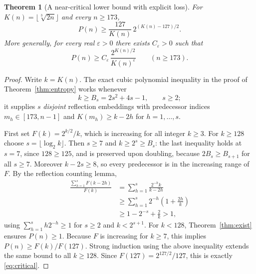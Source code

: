 \documentclass[10pt]{article}
\newtheorem{theorem}{Theorem}
\begin{document}
\begin{theorem}[A near-critical lower bound with explicit loss]
\label{thm:critical}
For $K(n)=\lfloor\sqrt[3]{2n}\rfloor$ and every $n\ge173$,
\begin{equation}\label{eq:critical}
\boxed{\displaystyle
P(n)\ge\frac{127}{K(n)}\,2^{(K(n)-127)/2}.}
\end{equation}
More generally, for every real $\varepsilon>0$
there exists $C_\varepsilon>0$ such that
\begin{equation}\label{eq:eps}
\boxed{\displaystyle
P(n)\ge C_\varepsilon\,
\frac{2^{K(n)/2}}{K(n)^\varepsilon}
\qquad(n\ge173).}
\end{equation}
\end{theorem}
\begin{proof}
Write $k=K(n)$. The exact cubic polynomial
inequality in the proof of
Theorem~\ref{thm:entropy} works whenever
\[
k\ge B_s=2s^2+4s-1,\qquad
s\ge2;
\]
it supplies $s$ \emph{disjoint} reflection
embeddings with predecessor indices
$m_h\in[173,n-1]$ and
$K(m_h)\ge k-2h$ for $h=1,\dots,s$.

First set $F(k)=2^{k/2}/k$, which is increasing
for all integer $k\ge3$. For $k\ge128$ choose
$s=\lfloor\log_2 k\rfloor$.
Then $s\ge7$ and $k\ge 2^s\ge B_s$:
the last inequality holds at $s=7$, since
$128\ge125$, and is preserved upon doubling,
because $2B_s\ge B_{s+1}$ for all $s\ge7$.
Moreover $k-2s\ge8$, so every predecessor
is in the increasing range of $F$.
By the reflection counting lemma,
\[
\begin{aligned}
\frac{\sum_{h=1}^{s}F(k-2h)}{F(k)}
&=\sum_{h=1}^{s}\frac{2^{-h}k}{k-2h}\\
&\ge\sum_{h=1}^{s}2^{-h}
  \left(1+\frac{2h}{k}\right)\\
&\ge1-2^{-s}+\frac2k>1,
\end{aligned}
\]
using $\sum_{h=1}^s h2^{-h}\ge1$ for
$s\ge2$ and $k<2^{s+1}$.
For $k<128$, Theorem~\ref{thm:exist}
ensures $P(n)\ge1$.
Because $F$ is increasing for $k\ge7$,
this implies
$P(n)\ge F(k)/F(127)$.
Strong induction using the above inequality
extends the same bound to all $k\ge128$.
Since $F(127)=2^{127/2}/127$,
this is exactly \eqref{eq:critical}.


\end{proof}
\end{document}
